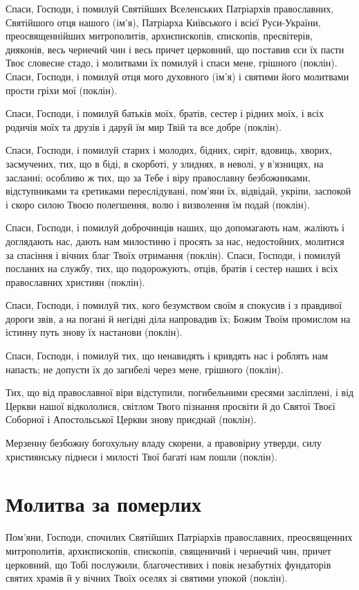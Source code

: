 \documentclass[chapters.tex]{subfiles}
\begin{document}
Спаси, Господи, і помилуй Святійших Вселенських Патріархів православних, Святійшого отця нашого (ім’я), Патріарха Київського і всієї Руси-України, преосвященнійших митрополитів, архиєпископів, єпископів, пресвітерів, дияконів, весь чернечий чин і весь причет церковний, що поставив єси їх пасти Твоє словесне стадо, і молитвами їх помилуй і спаси мене, грішного (поклін). Спаси, Господи, і помилуй отця мого духовного (ім’я) і святими його молитвами прости гріхи мої (поклін).

Спаси, Господи, і помилуй батьків моїх, братів, сестер і рідних моїх, і всіх родичів моїх та друзів і даруй їм мир Твій та все добре (поклін).

Спаси, Господи, і помилуй старих і молодих, бідних, сиріт, вдовиць, хворих, засмучених, тих, що в біді, в скорботі, у злиднях, в неволі, у в’язницях, на засланні; особливо ж тих, що за Тебе і віру православну безбожниками, відступниками та єретиками переслідувані, пом’яни їх, відвідай, укріпи, заспокой і скоро силою Твоєю полегшення, волю і визволення їм подай (поклін).

Спаси, Господи, і помилуй доброчинців наших, що допомагають нам, жаліють і доглядають нас, дають нам милостиню і просять за нас, недостойних, молитися за спасіння і вічних благ Твоїх отримання (поклін). Спаси, Господи, і помилуй посланих на службу, тих, що подорожують, отців, братів і сестер наших і всіх православних християн (поклін).

Спаси, Господи, і помилуй тих, кого безумством своїм я спокусив і з правдивої дороги звів, а на погані й негідні діла напровадив їх; Божим Твоїм промислом на істинну путь знову їх настанови (поклін).

Спаси, Господи, і помилуй тих, що ненавидять і кривдять нас і роблять нам напасть; не допусти їх до загибелі через мене, грішного (поклін).

Тих, що від православної віри відступили, погибельними єресями засліплені, і від Церкви нашої відкололися, світлом Твого пізнання просвіти й до Святої Твоєї Соборної і Апостольської Церкви знову приєднай (поклін).

Мерзенну безбожну богохульну владу скорени, а правовірну утверди, силу християнську піднеси і милості Твої багаті нам пошли (поклін).

\section{Молитва за померлих}
Пом’яни, Господи, спочилих Святійших Патріархів православних, преосвященних митрополитів, архиєпископів, єпископів, священичий і чернечий чин, причет церковний, що Тобі послужили, благочестивих і повік незабутніх фундаторів святих храмів й у вічних Твоїх оселях зі святими упокой (поклін).
\end{document}
